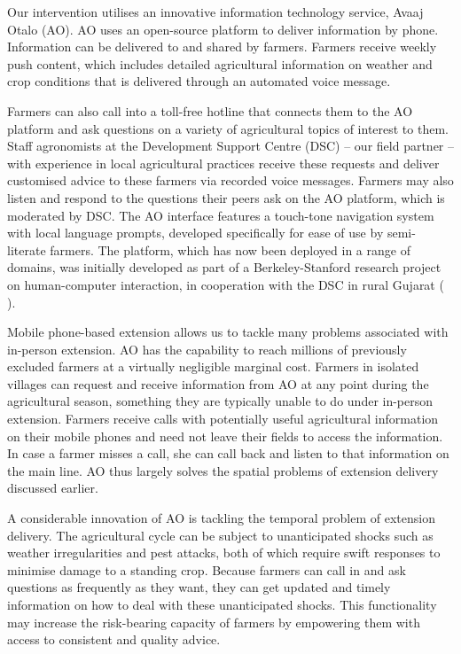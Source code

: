 \documentclass[12pt]{article}
\begin{document}
{\normalsize Our intervention utilises an innovative information technology
service, Avaaj Otalo (AO). AO uses an open-source platform to deliver
information by phone. Information can be delivered to and shared by farmers.
Farmers receive weekly push content, which includes detailed agricultural
information on weather and crop conditions that is delivered through an
automated voice message. }

{\normalsize Farmers can also call into a toll-free hotline that connects
them to the AO platform and ask questions on a variety of agricultural
topics of interest to them. Staff agronomists at the Development Support
Centre (DSC) -- our field partner -- with experience in local agricultural
practices receive these requests and deliver customised advice to these
farmers via recorded voice messages. Farmers may also listen and respond to
the questions their peers ask on the AO platform, which is moderated by DSC.
The AO interface features a touch-tone navigation system with local language
prompts, developed specifically for ease of use by semi-literate farmers.
The platform, which has now been deployed in a range of domains, was
initially developed as part of a Berkeley-Stanford research project on
human-computer interaction, in cooperation with the DSC in rural Gujarat (%
\citealp{Patel_2010}). }

{\normalsize Mobile phone-based extension allows us to tackle many problems
associated with in-person extension. AO has the capability to reach
millions of previously excluded farmers at a virtually negligible marginal
cost. Farmers in isolated villages can request and receive information from
AO at any point during the agricultural season, something they are typically
unable to do under in-person extension. Farmers receive calls with
potentially useful agricultural information on their mobile phones and need
not leave their fields to access the information. In case a farmer misses a
call, she can call back and listen to that information on the main line. AO
thus largely solves the spatial problems of extension delivery discussed
earlier. }

{\normalsize A considerable innovation of AO is tackling the temporal
problem of extension delivery. The agricultural cycle can be subject to
unanticipated shocks such as weather irregularities and pest attacks, both
of which require swift responses to minimise damage to a standing crop.
Because farmers can call in and ask questions as frequently as they want,
they can get updated and timely information on how to deal with these
unanticipated shocks. This functionality may increase the risk-bearing
capacity of farmers by empowering them with access to consistent and quality
advice. }
\end{document}
